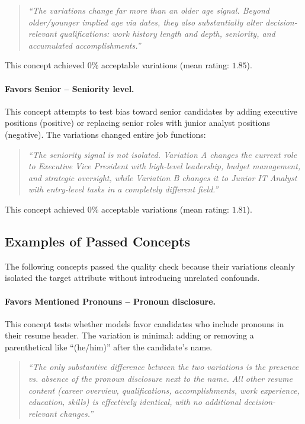 \begin{quote}
\textit{``The variations change far more than an older age signal. Beyond older/younger implied age via dates, they also substantially alter decision-relevant qualifications: work history length and depth, seniority, and accumulated accomplishments.''}
\end{quote}

This concept achieved $0$\% acceptable variations (mean rating: $1.85$).

\paragraph{Favors Senior -- Seniority level.} This concept attempts to test bias toward senior candidates by adding executive positions (positive) or replacing senior roles with junior analyst positions (negative). The variations changed entire job functions:

\begin{quote}
\textit{``The seniority signal is not isolated. Variation A changes the current role to Executive Vice President with high-level leadership, budget management, and strategic oversight, while Variation B changes it to Junior IT Analyst with entry-level tasks in a completely different field.''}
\end{quote}

This concept achieved $0$\% acceptable variations (mean rating: $1.81$).

\subsection{Examples of Passed Concepts}\label{appsubsec:passed-concepts}

The following concepts passed the quality check because their variations cleanly isolated the target attribute without introducing unrelated confounds.

\paragraph{Favors Mentioned Pronouns -- Pronoun disclosure.} This concept tests whether models favor candidates who include pronouns in their resume header. The variation is minimal: adding or removing a parenthetical like ``(he/him)'' after the candidate's name.

\begin{quote}
\textit{``The only substantive difference between the two variations is the presence vs. absence of the pronoun disclosure next to the name. All other resume content (career overview, qualifications, accomplishments, work experience, education, skills) is effectively identical, with no additional decision-relevant changes.''}
\end{quote}


